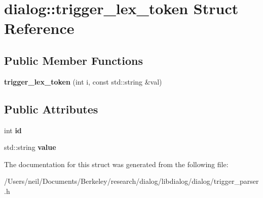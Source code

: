\hypertarget{structdialog_1_1trigger__lex__token}{}\section{dialog\+:\+:trigger\+\_\+lex\+\_\+token Struct Reference}
\label{structdialog_1_1trigger__lex__token}
\subsection*{Public Member Functions}
\begin{DoxyCompactItemize}
\item 
\mbox{\label{structdialog_1_1trigger__lex__token_a8c94fc6b0ca2e714fc6801152f3f9e73}} 
{\bfseries trigger\+\_\+lex\+\_\+token} (int i, const std\+::string \&val)
\end{DoxyCompactItemize}
\subsection*{Public Attributes}
\begin{DoxyCompactItemize}
\item 
\mbox{\label{structdialog_1_1trigger__lex__token_a406d80ed3ab6c06f080936865223a1ae}} 
int {\bfseries id}
\item 
\mbox{\label{structdialog_1_1trigger__lex__token_a3802f48f7934dcbcd483bbb5c21b170d}} 
std\+::string {\bfseries value}
\end{DoxyCompactItemize}


The documentation for this struct was generated from the following file\+:\begin{DoxyCompactItemize}
\item 
/\+Users/neil/\+Documents/\+Berkeley/research/dialog/libdialog/dialog/trigger\+\_\+parser.\+h\end{DoxyCompactItemize}

